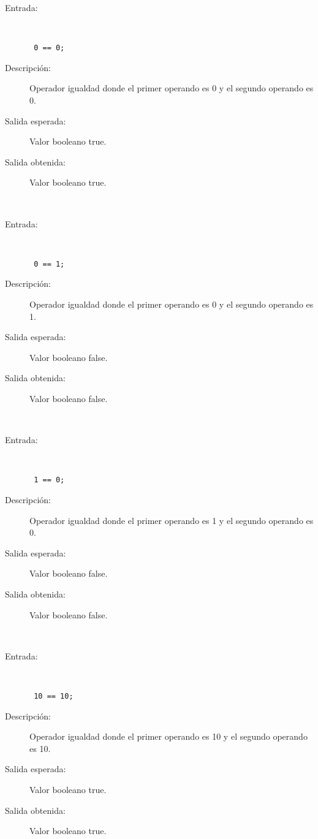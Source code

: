 	\begin{description}
		\item [Entrada:] \hfill \\
\begin{lstlisting}
 0 == 0;
\end{lstlisting}
		\item [Descripción:] Operador igualdad donde el primer operando es 0 y el segundo operando es  0.
		\item [Salida esperada:] Valor booleano true.
		\item [Salida obtenida:] Valor booleano true.
	\end{description}
\hfil \\
	\begin{description}
		\item [Entrada:] \hfill \\
\begin{lstlisting}
 0 == 1;
\end{lstlisting}
		\item [Descripción:] Operador igualdad donde el primer operando es 0 y el segundo operando es  1.
		\item [Salida esperada:] Valor booleano false.
		\item [Salida obtenida:] Valor booleano false.
	\end{description}
\hfil \\
	\begin{description}
		\item [Entrada:] \hfill \\
\begin{lstlisting}
 1 == 0;
\end{lstlisting}
		\item [Descripción:] Operador igualdad donde el primer operando es 1 y el segundo operando es  0.
		\item [Salida esperada:] Valor booleano false.
		\item [Salida obtenida:] Valor booleano false.
	\end{description}
\hfil \\
	\begin{description}
		\item [Entrada:] \hfill \\
\begin{lstlisting}
 10 == 10;
\end{lstlisting}
		\item [Descripción:] Operador igualdad donde el primer operando es 10 y el segundo operando es  10.
		\item [Salida esperada:] Valor booleano true.
		\item [Salida obtenida:] Valor booleano true.
	\end{description}
